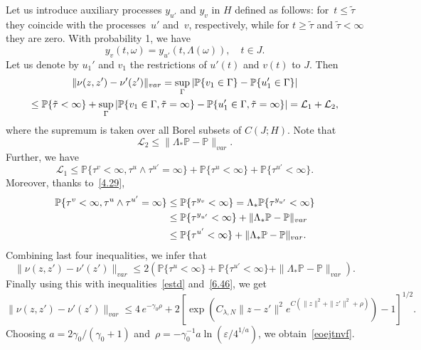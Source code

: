 \documentclass[10pt]{amsart}
\theoremstyle{definition}\newtheorem{defi}[theo]{Definition}\newtheorem{rema}[theo]{Remark}\newtheorem{exam}[theo]{Example}\newtheorem{exem}[theo]{Example}\newtheorem{nota}[theo]{Notation}
\newcommand{\e}{\varepsilon}
\newcommand{\pP}{{\mathbb P}}
\newcommand{\la}{\lambda}
\newcommand{\ty}{\infty}
\newcommand{\om}{\omega}
\newcommand{\elll}{{\mathcal L}}
\begin{document}
Let us introduce auxiliary processes $ y_{u'}$ and $y_v$ in $H$ defined as follows: for~$t\leq \tilde\tau$ they coincide with the processes~$ u'$ and~$v$, respectively, while for $t\geq\tilde\tau$ and $\tilde\tau<\ty$ they are zero. With probability 1, we have
\begin{equation}\label{4.29}
y_v(t,\om)=y_{u'}(t,\Lambda(\om)), \quad t\in J.
\end{equation}
Let us denote by $u_1'$ and $v_1$ the restrictions of $u'(t)$ and $v(t)$ to $J$. Then
\begin{multline*}
\| \nu(z,z')-\nu'(z')\|_{var}=\sup_{\Gamma}|\pP\{v_1\in\Gamma\}-\pP\{u'_1\in\Gamma\}\notag|\\
\leq \pP\{\tilde\tau<\ty\}+ \sup_{\Gamma}|\pP\{v_1\in\Gamma, \tilde\tau=\ty\} -\pP\{u'_1\in\Gamma, \tilde\tau=\ty\}|=\elll_1+\elll_2,
\end{multline*}
where the supremum is taken over all Borel subsets of $C(J;H)$. Note that
\[
\elll_2\leq\|\Lambda_*\pP-\pP\|_{var}.
\]
Further, we have
\[
\elll_1\leq \pP\{\tau^v<\ty, \tau^u\wedge\tau^{u'}=\ty\}+\pP\{\tau^u<\ty\}+\pP\{\tau^{u'}<\ty\}.
\]
Moreover, thanks to~\eqref{4.29},
\begin{align*}
\pP\{\tau^v<\ty, \tau^u\wedge\tau^{u'}=\ty\}&\leq\pP\{\tau^{y_v}<\ty\}=\Lambda_*\pP\{\tau^{y_{u'}}<\ty\}\notag\\
&\leq \pP\{\tau^{y_{u'}}<\ty\}+\|\Lambda_*\pP-\pP\|_{var}\notag\\
&\leq \pP\{\tau^{{u'}}<\ty\}+\|\Lambda_*\pP-\pP\|_{var}.
\end{align*}
Combining last four inequalities, we infer that
\[
\| \nu(z,z')-\nu'(z')\|_{var}\leq 2\left(\pP\{\tau^{u}<\ty\}+\pP\{\tau^{u'}<\ty\}+\|\Lambda_*\pP-\pP\|_{var}\right).
\]
Finally using this with inequalities~\eqref{estd} and~\eqref{6.46}, we get
\[
\| \nu(z,z')-\nu'(z')\|_{var}\leq 4\,e^{-\gamma_0\rho}+2\left[\exp\left(C_{\la, N}\|z-z'\|^2 e^{C(\|z\|^2+\|z'\|^2+\rho)} \right)-1\right]^{1/2}.
\]
Choosing $a=2\gamma_0/(\gamma_0+1)$ and~$\rho=-\gamma_0^{-1}a\ln(\e/4^{1/a})$, we obtain~\eqref{eoejtnvf}.
\end{document}
